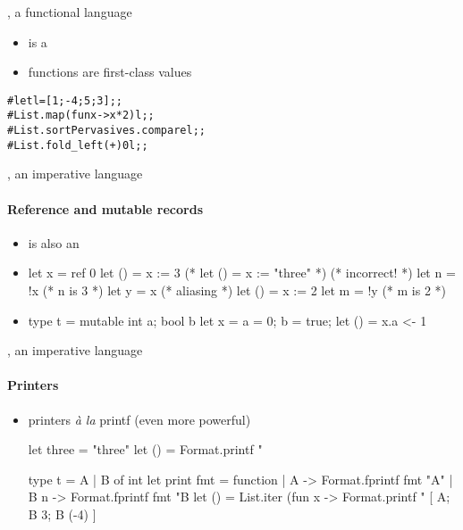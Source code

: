 \begin{frame}[fragile]{\ocaml, a functional language}
  
  \begin{itemize}
  \item \ocaml is a 
  \item functions are first-class values
  \end{itemize}
  \pause
  \begin{alltt}
    \# let l = [ 1; -4; 5; 3 ];;\pause
    \pause
    \# List.map (fun x -> x * 2) l;;\pause
    \pause
    \# List.sort Pervasives.compare l;;\pause
    \pause
    \# List.fold\_left ( + ) 0 l;;\pause
  \end{alltt}
  
\end{frame}

\begin{frame}[fragile]{\ocaml, an imperative language}
  \framesubtitle{Reference and mutable records}

  \begin{itemize}
  \item \ocaml is also an 
  \item {}
    \begin{ocamlcode}
let x = ref 0
let () = x := 3
(* let () = x := "three" *) (* incorrect! *)
let n = !x       (* n is 3 *)
let y = x        (* aliasing *)
let () = x := 2
let m = !y       (* m is 2 *)
    \end{ocamlcode}%
  \item {}
    \begin{ocamlcode}
type t = { mutable int a; bool b }
let x = { a = 0; b = true; }
let () = x.a <- 1
    \end{ocamlcode}
  \end{itemize}

\end{frame}

\begin{frame}[fragile]{\ocaml, an imperative language}
  \framesubtitle{Printers}

  \begin{itemize}
  \item printers \emph{\`a la} printf (even more powerful)
\begin{ocamlcode}
let three = "three"
let () = Format.printf "%

type t = A | B of int
let print fmt = function
  | A -> Format.fprintf fmt "A"
  | B n -> Format.fprintf fmt "B %
let () = 
  List.iter
    (fun x -> Format.printf "%
    [ A; B 3; B (-4) ]
\end{ocamlcode}
  \end{itemize}

\end{frame}

